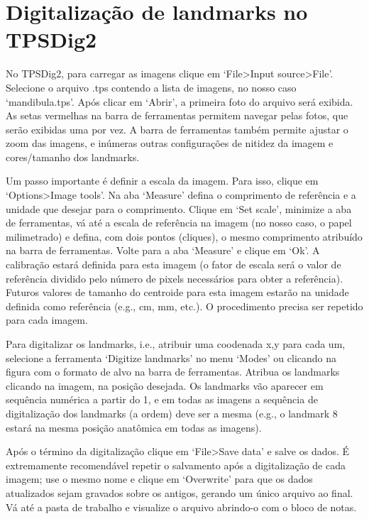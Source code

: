\documentclass[
]{book}
\begin{document}
\section{Digitalização de landmarks no TPSDig2}\label{digitalizauxe7uxe3o-de-landmarks-no-tpsdig2}

No TPSDig2, para carregar as imagens clique em `File\textgreater Input source\textgreater File'. Selecione o arquivo .tps contendo a lista de imagens, no nosso caso `mandibula.tps'. Após clicar em `Abrir', a primeira foto do arquivo será exibida. As setas vermelhas na barra de ferramentas permitem navegar pelas fotos, que serão exibidas uma por vez. A barra de ferramentas também permite ajustar o zoom das imagens, e inúmeras outras configurações de nitidez da imagem e cores/tamanho dos landmarks.

Um passo importante é definir a escala da imagem. Para isso, clique em `Options\textgreater Image tools'. Na aba `Measure' defina o comprimento de referência e a unidade que desejar para o comprimento. Clique em `Set scale', minimize a aba de ferramentas, vá até a escala de referência na imagem (no nosso caso, o papel milimetrado) e defina, com dois pontos (cliques), o mesmo comprimento atribuído na barra de ferramentas. Volte para a aba `Measure' e clique em `Ok'. A calibração estará definida para esta imagem (o fator de escala será o valor de referência dividido pelo número de pixels necessários para obter a referência). Futuros valores de tamanho do centroide para esta imagem estarão na unidade definida como referência (e.g., cm, mm, etc.). O procedimento precisa ser repetido para cada imagem.

Para digitalizar os landmarks, i.e., atribuir uma coodenada x,y para cada um, selecione a ferramenta `Digitize landmarks' no menu `Modes' ou clicando na figura com o formato de alvo na barra de ferramentas. Atribua os landmarks clicando na imagem, na posição desejada. Os landmarks vão aparecer em sequência numérica a partir do 1, e em todas as imagens a sequência de digitalização dos landmarks (a ordem) deve ser a mesma (e.g., o landmark 8 estará na mesma posição anatômica em todas as imagens).

Após o término da digitalização clique em `File\textgreater Save data' e salve os dados. É extremamente recomendável repetir o salvamento após a digitalização de cada imagem; use o mesmo nome e clique em `Overwrite' para que os dados atualizados sejam gravados sobre os antigos, gerando um único arquivo ao final. Vá até a pasta de trabalho e visualize o arquivo abrindo-o com o bloco de notas.
\end{document}
